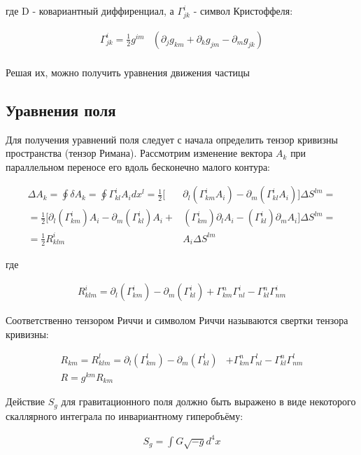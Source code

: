 \documentclass[a4paper,14pt]{article}
\begin{document}
	где D - ковариантный диффиренциал, а $ \Gamma_{jk}^i $ - символ Кристоффеля: 

	\begin{align*}
		\Gamma_{jk}^i = \frac{1}{2} g^{im} & ( \partial_{j} g_{km} + \partial_{k} g_{jm} - \partial_{m} g_{jk} ) \\
	\end{align*}

	Решая их, можно получить уравнения движения частицы

\subsection*{Уравнения поля}	
	
	Для получения уравнений поля следует с начала определить тензор кривизны пространства (тензор Римана). Рассмотрим изменение вектора $ A_k $ при параллельном переносе его вдоль бесконечно малого контура:

	\begin{align*}
		\Delta A_k = \oint \delta A_k = \oint \Gamma_{kl}^i A_i dx^l 
		= \frac{1}{2} [ & \partial_l (\Gamma_{km}^i A_i) - \partial_m (\Gamma_{kl}^i A_i)] \Delta S^{lm} = \\
		= \frac{1}{2} [   \partial_l (\Gamma_{km}^i) A_i - \partial_m (\Gamma_{kl}^i) A_i + & (\Gamma_{km}^i) \partial_l A_i - (\Gamma_{kl}^i) \partial_m A_i ] \Delta S^{lm} = \\
		= \frac{1}{2} R^i_{klm} & A_i \Delta S^{lm}
	\end{align*}

	где 

	\begin{align*}
		R^i_{klm} = \partial_l (\Gamma_{km}^i) - \partial_m (\Gamma_{kl}^i)  + \Gamma_{km}^n \Gamma_{nl}^i - \Gamma_{kl}^n \Gamma_{nm}^i
	\end{align*}

	Соответственно тензором Риччи и символом Риччи называются свертки тензора кривизны:

	\begin{align*}
		R_{km} = R^l_{klm} = \partial_l (\Gamma_{km}^l) - \partial_m (\Gamma_{kl}^l) & + \Gamma_{km}^n \Gamma_{nl}^l - \Gamma_{kl}^n \Gamma_{nm}^l \\
		R  = g^{km} R_{km} &
	\end{align*}

	Действие $ S_g $ для гравитационного поля должно быть выражено в виде некоторого скаллярного интеграла по инвариантному гиперобъёму:

	\begin{align*}
		S_g = \int G \sqrt{-g} d^4 x
	\end{align*}
\end{document}
